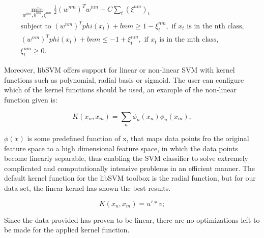\documentclass[11pt]{report}
\begin{document}
\begin{equation}
\begin{multlined}
\min_{w^{nm},b^{nm},\xi^{nm}} \frac{1}{2} (w^{nm})^T w^{nm} + C \sum_t (\xi^{nm})_t \\
\text{subject to } (w^{nm})^T phi(x_t) + b{nm} \geq 1 - \xi_t^{nm},\text{ if } x_t \text{ is in the nth class,}\\
	      (w^{nm})^T phi(x_t) + b{nm} \leq -1 + \xi_t^{nm}, \text{ if } x_t \text{ is in the mth class,}\\
	      \xi_t^{nm} \geq 0.
\end{multlined}
\end{equation}

Moreover, libSVM offers support for linear or non-linear SVM with kernel functions such as  polynomial, radial basis or sigmoid. The user can configure which of the kernel functions should be used, an example of the non-linear function given is:

\begin{equation}
K(x_n,x_m) = \sum_n \phi_n (x_n) \phi_n (x_m),
\end{equation}

\(\phi(x)\) is some predefined function of x, that maps data points fro the original feature space to a high dimensional feature space, in which the data points become linearly separable, thus enabling the SVM classifier to solve extremely complicated and computationally intensive problems in an efficient manner. The default kernel function for the libSVM toolbox is the radial function, but for our data set, the linear kernel has shown the best results.

\begin{equation}
K(x_n,x_m) = u' * v;
\end{equation}

Since the data provided has proven to be linear, there are no optimizations left to be made for the applied kernel function.
\end{document}
